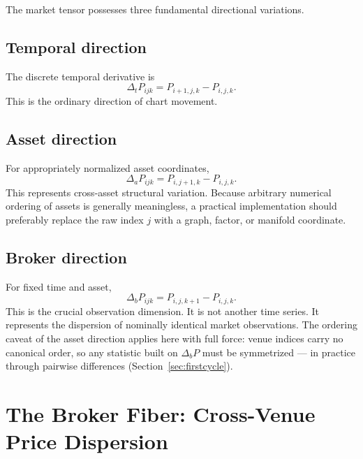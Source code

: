 \documentclass[11pt,a4paper]{article}
\numberwithin{equation}{section}
\begin{document}
The market tensor possesses three fundamental directional
variations.

\subsection{Temporal direction}

The discrete temporal derivative is
\begin{equation}
\Delta_tP_{ijk}=P_{i+1,j,k}-P_{i,j,k}.
\label{eq:dt}
\end{equation}
This is the ordinary direction of chart movement.

\subsection{Asset direction}

For appropriately normalized asset coordinates,
\begin{equation}
\Delta_aP_{ijk}=P_{i,j+1,k}-P_{i,j,k}.
\label{eq:da}
\end{equation}
This represents cross-asset structural variation. Because arbitrary
numerical ordering of assets is generally meaningless, a practical
implementation should preferably replace the raw index $j$ with a
graph, factor, or manifold coordinate.

\subsection{Broker direction}

For fixed time and asset,
\begin{equation}
\Delta_bP_{ijk}=P_{i,j,k+1}-P_{i,j,k}.
\label{eq:db}
\end{equation}
This is the crucial observation dimension. It is not another time
series. It represents the dispersion of nominally identical market
observations. The ordering caveat of the asset direction applies
here with full force: venue indices carry no canonical order, so
any statistic built on $\Delta_bP$ must be symmetrized --- in
practice through pairwise differences
(Section~\ref{sec:firstcycle}).

\section{The Broker Fiber: Cross-Venue Price Dispersion}
\end{document}
